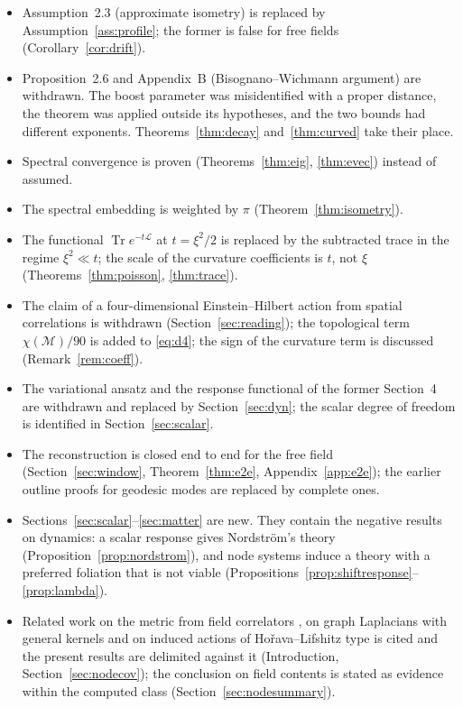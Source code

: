 \documentclass[11pt,a4paper]{article}
\theoremstyle{stmt}
\theoremstyle{defn}
\theoremstyle{rmk}
\numberwithin{equation}{section}
\DeclareMathOperator{\Tr}{Tr}
\newcommand{\M}{\mathcal{M}}
\newcommand{\Lc}{\mathcal{L}}
\begin{document}
\begin{itemize}
\item Assumption~2.3 (approximate isometry) is replaced by Assumption~\ref{ass:profile}; the former is false for free fields (Corollary~\ref{cor:drift}).
\item Proposition~2.6 and Appendix~B (Bisognano--Wichmann argument) are withdrawn. The boost parameter was misidentified with a proper distance, the theorem was applied outside its hypotheses, and the two bounds had different exponents. Theorems~\ref{thm:decay} and~\ref{thm:curved} take their place.
\item Spectral convergence is proven (Theorems~\ref{thm:eig}, \ref{thm:evec}) instead of assumed.
\item The spectral embedding is weighted by $\pi$ (Theorem~\ref{thm:isometry}).
\item The functional $\Tr e^{-t\Lc}$ at $t=\xi^2/2$ is replaced by the subtracted trace in the regime $\xi^2\ll t$; the scale of the curvature coefficients is $t$, not $\xi$ (Theorems~\ref{thm:poisson}, \ref{thm:trace}).
\item The claim of a four-dimensional Einstein--Hilbert action from spatial correlations is withdrawn (Section~\ref{sec:reading}); the topological term $\chi(\M)/90$ is added to \eqref{eq:d4}; the sign of the curvature term is discussed (Remark~\ref{rem:coeff}).
\item The variational ansatz and the response functional of the former Section~4 are withdrawn and replaced by Section~\ref{sec:dyn}; the scalar degree of freedom is identified in Section~\ref{sec:scalar}.
\item The reconstruction is closed end to end for the free field (Section~\ref{sec:window}, Theorem~\ref{thm:e2e}, Appendix~\ref{app:e2e}); the earlier outline proofs for geodesic modes are replaced by complete ones.
\item Sections~\ref{sec:scalar}--\ref{sec:matter} are new. They contain the negative results on dynamics: a scalar response gives Nordstr\"om's theory (Proposition~\ref{prop:nordstrom}), and node systems induce a theory with a preferred foliation that is not viable (Propositions~\ref{prop:shiftresponse}--\ref{prop:lambda}).
\item Related work on the metric from field correlators \cite{SAK,Kempf21,PercheMM}, on graph Laplacians with general kernels \cite{HAvL,THJ} and on induced actions of Ho\v{r}ava--Lifshitz type \cite{NS10,DSS,LMP} is cited and the present results are delimited against it (Introduction, Section~\ref{sec:nodecov}); the conclusion on field contents is stated as evidence within the computed class (Section~\ref{sec:nodesummary}).

\end{itemize}
\end{document}
